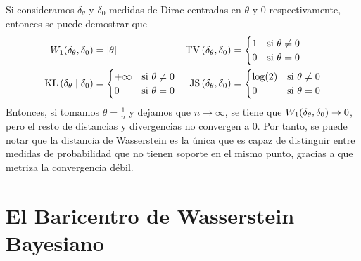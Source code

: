 {{\begin{example}
		  Si consideramos $\delta_\theta$ y $\delta_0$ medidas de Dirac centradas en $\theta$ y $0$ respectivamente, entonces se puede demostrar que
		  \begin{align*}
			  \Wasserstein[1]{\delta_\theta}{\delta_0} & = |\theta|                            &
			  \TV{\delta_\theta}{\delta_0}             & = \begin{cases}
				                                               1 & \text{si } \theta \neq 0 \\
				                                               0 & \text{si } \theta = 0
			                                               \end{cases}          \\
			  \KL{\delta_\theta}{\delta_0}             & = \begin{cases}
				                                               +\infty & \text{si } \theta \neq 0 \\
				                                               0       & \text{si } \theta = 0
			                                               \end{cases} &
			  \JS{\delta_\theta}{\delta_0}             & = \begin{cases}
				                                               \log(2) & \text{si } \theta \neq 0 \\
				                                               0       & \text{si } \theta = 0
			                                               \end{cases}
		  \end{align*}
		  Entonces, si tomamos $\theta = \frac{1}{n} $ y dejamos que $n \to \infty$, se tiene que $\Wasserstein[1]{\delta_\theta}{\delta_0} \to 0$, pero el resto de distancias y divergencias no convergen a 0.
		  Por tanto, se puede notar que la distancia de Wasserstein es la única que es capaz de distinguir entre medidas de probabilidad que no tienen soporte en el mismo punto, gracias a que metriza la convergencia débil.
	  \end{example}

  }  %

  \section{El Baricentro de Wasserstein Bayesiano}\label{sec:el-baricentro-de-Wasserstein-Bayesiano}
  {
}}
